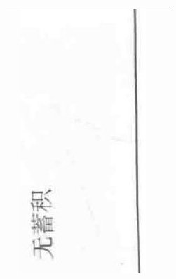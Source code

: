 \documentclass[10pt]{article}
\begin{document}
\begin{center}
\begin{tabular}{|c|c|c|c|}
 & \includegraphics[max width=\textwidth]{2024_07_05_645bb794a4d4f32ee0c8g-332}
 \\
\hline

\end{tabular}
\end{center}
\end{document}
